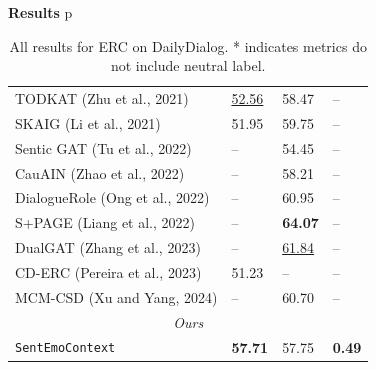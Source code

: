 \documentclass[final,hyperref={pdfpagelabels=false},unknownkeysallowed]{beamer} %
\begin{document}
\begin{frame}
\begin{minipage}{0.505\textwidth}
\begin{block}{\textbf{Results} {\color{block title.bg}p}}
\begin{center}
\begin{table}[!ht]
\begin{tabular}{@{}llll@{}}
      TODKAT \textcolor{aclblue}{(Zhu et al., 2021)}                        &  \underline{52.56}    & 58.47                & -- \\
      SKAIG \textcolor{aclblue}{(Li et al., 2021)}                     & 51.95                 & 59.75                & -- \\
      Sentic GAT \textcolor{aclblue}{(Tu et al., 2022)}                                 & --                    & 54.45                & -- \\
      CauAIN \textcolor{aclblue}{(Zhao et al., 2022)}                                & --                    & 58.21                & -- \\
      DialogueRole \textcolor{aclblue}{(Ong et al., 2022)}                       & --                    & 60.95                & -- \\
      S+PAGE \textcolor{aclblue}{(Liang et al., 2022)}                         & --                    & \textbf{64.07}       & -- \\
      DualGAT \textcolor{aclblue}{(Zhang et al., 2023)}                    & --                    & \underline{61.84}    & -- \\
      CD-ERC \textcolor{aclblue}{(Pereira et al., 2023)}                   & 51.23                 & --                   & -- \\
      MCM-CSD \textcolor{aclblue}{(Xu and Yang, 2024)}                                   & --                    &  60.70               & --  \\
      \midrule
      \multicolumn{4}{c}{\textit{Ours}}\\ \midrule
      \texttt{SentEmoContext}                                          &  \textbf{57.71}       &  57.75            & \textbf{0.49}\\
      \bottomrule
      \end{tabular}
      \vspace{1ex}
      \caption{\centering All results for ERC on DailyDialog. * indicates metrics do not include neutral label.}
      \end{table}
  \end{center}
\vspace{-1ex}
  \end{block}
  \end{minipage}


\end{frame}
\end{document}
